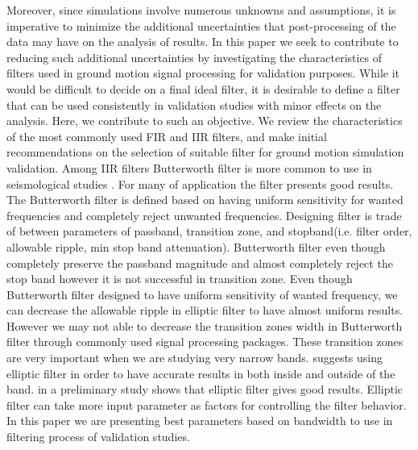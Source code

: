 Moreover, since simulations involve numerous unknowns and assumptions, it is imperative to minimize the additional uncertainties that post-processing of the data may have on the analysis of results. In this paper we seek to contribute to reducing such additional uncertainties by investigating the characteristics of filters used in ground motion signal processing for validation purposes. While it would be difficult to decide on a final ideal filter, it is desirable to define a filter that can be used consistently in validation studies with minor effects on the analysis. Here, we contribute to such an objective. We review the characteristics of the most commonly used FIR and IIR filters, and make initial recommendations on the selection of suitable filter for ground motion simulation validation. Among IIR filters Butterworth filter is more common to use in seismological studies \citep{Ma_2008,Lee_2014,Olsen_2003}. For many of application the filter presents good results. The Butterworth filter is defined based on having uniform sensitivity for wanted frequencies and completely reject unwanted frequencies. Designing filter is trade of between parameters of passband, transition zone, and stopband(i.e. filter order, allowable ripple, min stop band attenuation). Butterworth filter even though completely preserve the passband magnitude and almost completely reject the stop band however it is not successful in transition zone. Even though Butterworth filter designed to have uniform sensitivity of wanted frequency, we can decrease the allowable ripple in elliptic filter to have almost uniform results. However we may not able to decrease the transition zones width in Butterworth filter through commonly used signal processing packages. These transition zones are very important when we are studying very narrow bands. \citet{Oppenheim_1989} suggests using elliptic filter in order to have accurate results in both inside and outside of the band. \citet{Khoshnevis_2015} in a preliminary study shows that elliptic filter gives good results. Elliptic filter can take more input parameter as factors for controlling the filter behavior.   In this paper we are presenting best parameters based on bandwidth to use in filtering process of validation studies. 
